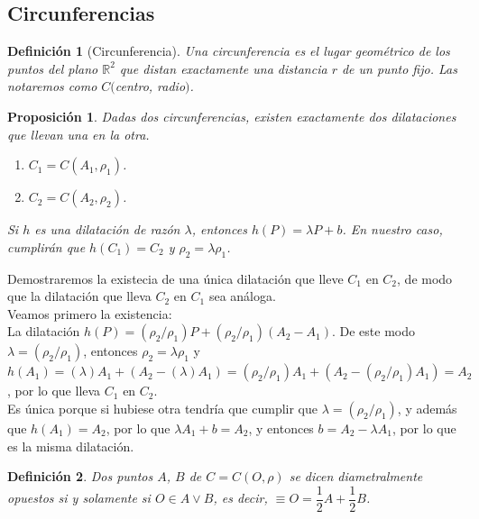 \documentclass[11pt, a4paper]{article}
\makeatletter
\newif\IfInSansMode
\let\oldsf\sffamily
\renewcommand*{\sffamily}{\oldsf\mathversion{sans}\InSansModetrue}
\let\oldnorm\normalfont
\renewcommand*{\normalfont}{\oldnorm\InSansModefalse\mathversion{normal}}
\renewenvironment{proof}[1][\proofname] {\vspace{-15pt}\par\pushQED{\qed}\normalfont\topsep6\p@\@plus6\p@\relax\trivlist\item[\hskip\labelsep\it#1\@addpunct{.}]\ignorespaces}{\popQED\endtrivlist\@endpefalse}
\newcommand{\R}{\mathbb{R}}
\renewenvironment{proof}[1][\proofname] {\par\pushQED{\qed}\normalfont\topsep6\p@\@plus6\p@\relax\trivlist\item[\hskip\labelsep\itshape\sffamily#1\@addpunct{.}]\ignorespaces}{\popQED\endtrivlist\@endpefalse}
\theoremstyle{theorem-style}
\newtheorem{nprop}{Proposición}[section]
\theoremstyle{definition-style}
\newtheorem{ndef}{Definición}[section]
\theoremstyle{remark-style}
\theoremstyle{example-style}
\makeatother
\begin{document}
\subsection{Circunferencias}

\begin{ndef}[Circunferencia]
  Una circunferencia es el lugar geométrico de los puntos del plano $\R^2$ que distan exactamente una distancia $r$ de un punto fijo. Las notaremos como $C($centro, radio$)$.
\end{ndef}

\begin{nprop}
  Dadas dos circunferencias, existen exactamente dos dilataciones que llevan una en la otra.
  \begin{enumerate}
  \item $C_1 = C(A_1,\rho_1)$.
  \item $C_2 = C(A_2,\rho_2)$.
  \end{enumerate}
  Si $h$ es una dilatación de razón $\lambda$, entonces $h(P) = \lambda P + b$.
  En nuestro caso, cumplirán que $h(C_1) = C_2$ y $\rho_2 = \lambda \rho_1$.
\end{nprop}

\begin{proof}
	Demostraremos la existecia de una única dilatación que lleve $C_1$ en $C_2$, de modo que la dilatación que lleva $C_2$ en $C_1$ sea análoga. \\
	
	Veamos primero la existencia:\\
		La dilatación $h(P) = (\rho_2/\rho_1)P + (\rho_2/\rho_1) (A_2-A_1)$. De este modo $\lambda = (\rho_2/\rho_1)$, entonces $\rho_2 = \lambda \rho_1$ y $h(A_1) = (\lambda)A_1 +  (A_2-(\lambda)A_1) = (\rho_2/\rho_1)A_1 +  (A_2-(\rho_2/\rho_1)A_1) = A_2$, por lo que lleva $C_1$ en $C_2$. \\
		
	Es única porque si hubiese otra tendría que cumplir que  $\lambda = (\rho_2/\rho_1)$, y además que $h(A_1) = A_2$, por lo que $\lambda A_1 + b = A_2$, y entonces $b= A_2- \lambda A_1$, por lo que es la misma dilatación.\\
	
\end{proof}

\begin{ndef}
  Dos puntos $A$, $B$ de $C = C(O,\rho) $ se dicen diametralmente opuestos si y solamente si $O \in A \vee B$, es decir, $\equiv O = \dfrac{1}{2}A + \dfrac{1}{2}B$.
\end{ndef}
\end{document}
